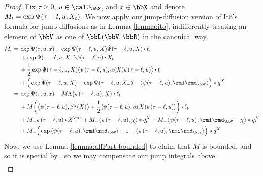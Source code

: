 \begin{proof}
  \label{proof:proposition:affine-resolution}
  Fix $\tau \geq 0$, $\momentVar \in \boundedSpace$, and $\stateVar \in \stateSpace$ and denote $M_t = \exp\Psi(\tau-t, u, X_t)$.
  We now apply our jump-diffusion version of It\^o's formula for jump-diffusions as in Lemma \ref{lemma:ito}, indifferently treating an element of $\vecSpace$ as one of $\bbL(\vecSpace, \bbR)$ in the canonical way.
  \begin{align*}
    M_t 
    &= \begin{aligned}[t]
      &\exp\aff(\tau, \momentVar, \stateVar) 
      - \exp\aff(\tau-\leb, \momentVar, \X) \dot\aff(\tau-\leb, \momentVar, \X) \shortInt \leb_t  \\
      &+ \exp\aff(\tau-\leb, \momentVar, \X_-) \affPart(\tau-\leb, \momentVar) \shortInt \X_t  \\
      &+ \frac12 \exp\aff(\tau-\leb, \momentVar, \X) \bprj{\affPart(\tau-\leb,\momentVar)}{\affDiff(\X)\affPart(\tau-\leb,\momentVar)} \shortInt \leb \\
      &+ \Big( \exp\aff(\tau-\leb, \momentVar, \X) - \exp\aff(\tau-\leb, \momentVar, \X_-) - \bprj{\affPart(\tau-\leb, \momentVar)}{\id_\vecSpace} \Big) \ast \jumpMeas^\X
    \end{aligned} \\
    &= \begin{aligned}[t]
      &\exp\aff(\tau, \momentVar, \stateVar) 
      - M \ode\big(\affPart(\tau-\leb, \momentVar), \X\big) \shortInt \leb_t \\
      &+ M \bigg( \bprj{\affPart(\tau-\leb, \momentVar)}{\affDrift^\trunc(\X)} + \frac12 \prj{\affPart(\tau-\leb,\momentVar)}{\affDiff(\X)\affPart(\tau-\leb,\momentVar)} \bigg) \shortInt \leb_t \\
      &+ M_- \affPart(\tau-\leb, \momentVar) \shortInt \X^\rmc
      + M_- \bprj{\affPart(\tau-\leb,\momentVar)}{\trunc} \ast \compensate{\jumpMeas^\X}_t 
      + M_- \bprj{\affPart(\tau-\leb, \momentVar)}{\id_\vecSpace-\trunc} \ast \jumpMeas^\X_t \\
      &+ M_- \Big( \exp\prj{\affPart(\tau-\leb,\momentVar)}{\id_\vecSpace} - 1 - \bprj{\affPart(\tau-\leb, \momentVar)}{\id_\vecSpace} \Big) \ast \jumpMeas^\X
    \end{aligned} 
  \end{align*}
  Now, we use Lemma \ref{lemma:affPart-bounded} to claim that $M$ is bounded, and so it is special by \cite[Lemma I.4.24]{jacod2003}, so we may compensate our jump integrals above.
  \begin{align*}

\end{align*}
\end{proof}
